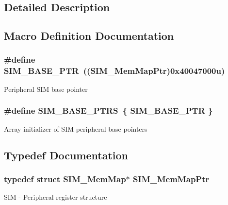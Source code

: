 \subsection{Detailed Description}


\subsection{Macro Definition Documentation}
\hypertarget{group___s_i_m___peripheral_ga719ec5df95fbb5732438f794f2cccf3c}{}
\subsubsection[{S\+I\+M\+\_\+\+B\+A\+S\+E\+\_\+\+P\+T\+R}]{\setlength{\rightskip}{0pt plus 5cm}\#define S\+I\+M\+\_\+\+B\+A\+S\+E\+\_\+\+P\+T\+R~(({\bf S\+I\+M\+\_\+\+Mem\+Map\+Ptr})0x40047000u)}\label{group___s_i_m___peripheral_ga719ec5df95fbb5732438f794f2cccf3c}
Peripheral S\+I\+M base pointer \hypertarget{group___s_i_m___peripheral_ga2fd213a3b9fc7d761ab0cdeb74c34f91}{}
\subsubsection[{S\+I\+M\+\_\+\+B\+A\+S\+E\+\_\+\+P\+T\+R\+S}]{\setlength{\rightskip}{0pt plus 5cm}\#define S\+I\+M\+\_\+\+B\+A\+S\+E\+\_\+\+P\+T\+R\+S~\{ {\bf S\+I\+M\+\_\+\+B\+A\+S\+E\+\_\+\+P\+T\+R} \}}\label{group___s_i_m___peripheral_ga2fd213a3b9fc7d761ab0cdeb74c34f91}
Array initializer of S\+I\+M peripheral base pointers 

\subsection{Typedef Documentation}
\hypertarget{group___s_i_m___peripheral_ga708a122e8ca55082e0cf67cab6a77d02}{}
\subsubsection[{S\+I\+M\+\_\+\+Mem\+Map\+Ptr}]{\setlength{\rightskip}{0pt plus 5cm}typedef struct {\bf S\+I\+M\+\_\+\+Mem\+Map}$\ast$ {\bf S\+I\+M\+\_\+\+Mem\+Map\+Ptr}}\label{group___s_i_m___peripheral_ga708a122e8ca55082e0cf67cab6a77d02}
S\+I\+M -\/ Peripheral register structure 